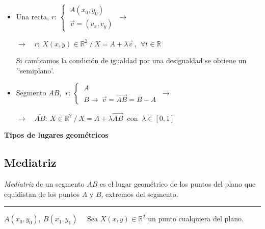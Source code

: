 \begin{itemize}
\item Una recta, $r:\, \begin{cases}\ A(x_0,y_0) \\ \ \vec v=(v_x,v_y) \end{cases} \ \to \ $

\hspace{2cm} $\to \quad r:\ X(x,y)\in \mathbb R^2 \ / \ X=A+\lambda \vec v\, , \ \ \forall t\in \mathbb R$

Si cambiamos la condición de igualdad por una desigualdad se obtiene un '`semiplano'.
\item Segmento $AB$, $\ r:\, \begin{cases} \ A \\ \ B \to \ \vec v =\overrightarrow{AB}=B-A \end{cases} \ \to \ $
 
\hspace{2cm} $\to \quad \overline{AB}:\ X\in \mathbb
 R^2 \ / \ X=A+\lambda \overrightarrow{AB} \ \text{ con } \ \lambda \in [0,1]$
 \end{itemize}

\vspace{5mm}
\begin{large}
\textbf{Tipos de lugares geométricos}	
\end{large}

\subsection{Mediatriz}
\vspace{0.5cm}

\begin{definition}[ Mediatriz]

\emph{Mediatriz} de un segmento $AB$  es el lugar geométrico de los puntos del plano que equidistan de los puntos $A$ y $B$, extremos del segmento.	
\end{definition}

\vspace{5mm}

\color{gris}
\rule{250pt}{0.1pt}

$A(x_0,y_0), \ B(x_1,y_1)\quad $ Sea $X(x,y)\in \mathbb R^2$ un punto cualquiera del plano.

